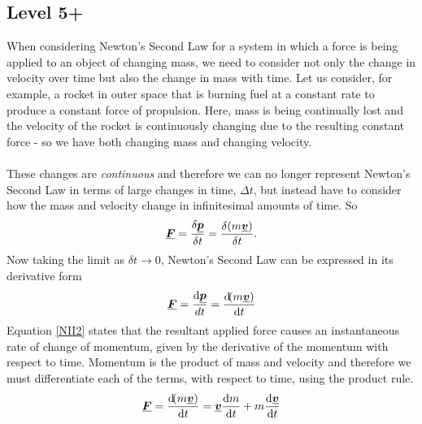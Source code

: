 \subsection{Level 5+}
When considering Newton's Second Law for a system in which a force is being applied to an object of changing mass, we need to consider not only the change in velocity over time but also the change in mass with time.  Let us consider, for example, a rocket in outer space that is burning fuel at a constant rate to produce a constant force of propulsion.  Here, mass is being continually lost and the velocity of the rocket is continuously changing due to the resulting constant force - so we have both changing mass and changing velocity.\\
\\
These changes are \emph{continuous} and therefore we can no longer represent Newton's Second Law in terms of large changes in time, $\Delta t$, but instead have to consider how the mass and velocity change in infinitesimal amounts of time.  So
\begin{equation}
{\mathit{\underline{\boldsymbol{F}}}}= \frac{\delta{\mathit{\underline{\boldsymbol{p}}}}}{\delta t}= \frac{\delta(m {\mathit{\underline{\boldsymbol{v}}}})}{\delta t}.
\end{equation}
Now taking the limit as $\delta t \rightarrow 0$, Newton's Second Law can be expressed in its derivative form
\begin{equation}
{\mathit{\underline{\boldsymbol{F}}}}=\frac{\operatorname{d}\!{\mathit{\underline{\boldsymbol{p}}}}}{dt}=\frac{\operatorname{d}\!(m{\mathit{\underline{\boldsymbol{v}}}})}{\operatorname{d}\! t} \label{NII2}
\end{equation}
Equation \ref{NII2} states that the resultant applied force causes an instantaneous rate of change of momentum, given by the derivative of the momentum with respect to time.  Momentum is the product of mass and velocity and therefore we must differentiate each of the terms, with respect to time, using the product rule.
 \begin{equation}
{\mathit{\underline{\boldsymbol{F}}}}=\frac{\operatorname{d}\!(m{\mathit{\underline{\boldsymbol{v}}}})}{\operatorname{d}\! t}={\mathit{\underline{\boldsymbol{v}}}}\frac{\operatorname{d}\! m}{\operatorname{d}\! t}+m\frac{\operatorname{d}\!{\mathit{\underline{\boldsymbol{v}}}}}{\operatorname{d}\! t}
\end{equation}
